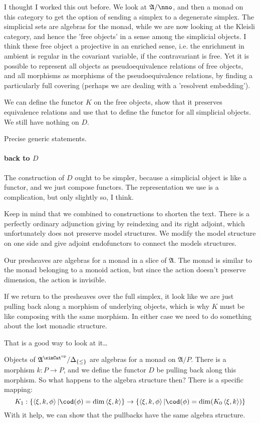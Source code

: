 \documentclass{tac}
\newcommand\set[1]{\left\{#1\right\}}
\newcommand\dual{^{\mathrm{op}}}
\newcommand\s{^{\simCat\dual}}
\newcommand\of{:}
\newcommand\simplex\Delta
\newcommand\tuplet[1]{\left\langle #1 \right\rangle}
\newcommand\ambient{\mathfrak A}
\begin{document}
I thought I worked this out before. We look at $\ambient/\nno$, and then a monad on this category to get the option of sending a simplex to a degenerate simplex. The simplicial sets are algebras for the monad, while we are now looking at the Kleisli category, and hence the 'free objects' in a sense among the simplicial objects. I think these free object a projective in an enriched sense, i.e. the enrichment in ambient is regular in the covariant variable, if the contravariant is free. Yet it is possible to represent all objects as pseudoequivalence relations of free objects, and all morphisms as morphisms of the pseudoequivalence relations, by finding a particularly full covering (perhaps we are dealing with a 'resolvent embedding').

We can define the functor $K$ on the free objects, show that it preserves equivalence relations and use that to define the functor for all simplicial objects.
We still have nothing on $D$.

Precise generic statements.

\paragraph{back to $D$}
The construction of $D$ ought to be simpler, because a simplicial object is like a functor, and we just compose functors.
The representation we use is a complication, but only slightly so, I think.

Keep in mind that we combined to constructions to shorten the text. There is a perfectly ordinary adjunction giving by reindexing and its right adjoint, which unfortunately does not preserve model structures. We modify the model structure on one side and give adjoint endofunctors to connect the models structures.

Our presheaves are algebras for a monad in a slice of $\ambient$. The monad is similar to the monad belonging to a monoid action, but since the action doesn't preserve dimension, the action is invisible.

If we return to the presheaves over the full simplex, it look like we are just pulling back along a morphism of underlying objects, which is why $K$ must be like composing with the same morphism. In either case we need to do something about the lost monadic structure.

That is a good way to look at it\dots

Objects of $\ambient\s/\simplex_{\set\leq}$ are algebras for a monad on $\ambient/P$. There is a morphism $k\of P\to P$, and we define the functor $D$ be pulling back along this morphism. So what happens to the algebra structure then? There is a specific mapping:
\[ K_1\of \set{ \tuplet{\xi,k,\phi} | \cod(\phi)=\dim\tuplet{\xi,k} } \to \set{ \tuplet{\xi,k,\phi} | \cod(\phi) = \dim(K_0\tuplet{\xi,k}) } \]
With it help, we can show that the pullbacks have the same algebra structure.
\end{document}
